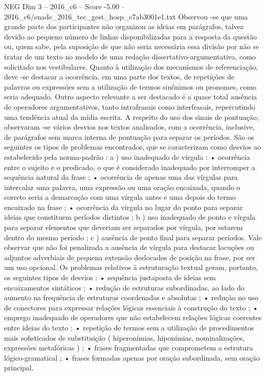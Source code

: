 \begin{textsample}{NEG Dim 3 – 2016\_c6 – Score -5.00 – 2016\_c6/enade\_2016\_tec\_gest\_hosp\_c7ab3001e1.txt}
Observou -se que uma grande parte dos participantes não organizou as ideias em parágrafos, talvez devido ao pequeno número de linhas disponibilizadas para a resposta da questão ou, quem sabe, pela suposição de que não seria necessária essa divisão por não se tratar de um texto no modelo de uma redação dissertativo-argumentativa, como solicitado nos vestibulares.
Quanto à utilização dos mecanismos de referenciação, deve -se destacar a ocorrência, em uma parte dos textos, de repetições de palavras ou expressões sem a utilização de termos sinônimos ou pronomes, como seria adequado.
Outro aspecto relevante a ser destacado é a quase total ausência de operadores argumentativos, tanto intrafrasais como interfrasais, repercutindo uma tendência atual da mídia escrita.
A respeito do uso dos sinais de pontuação, observaram -se vários desvios nos textos analisados, com a ocorrência, inclusive, de parágrafos sem marca interna de pontuação para separar os períodos.
São os seguintes os tipos de problemas encontrados, que se caracterizam como desvios ao estabelecido pela norma-padrão : a ) uso inadequado de vírgula : • ocorrência entre o sujeito e o predicado, o que é considerado inadequado por interromper a sequência natural da frase ; • ocorrência de apenas uma das vírgulas para intercalar uma palavra, uma expressão ou uma oração encaixada, quando o correto seria a demarcação com uma vírgula antes e uma depois do termo encaixado na frase ; • ocorrência da vírgula no lugar do ponto para separar ideias que constituem períodos distintos ; b ) uso inadequado de ponto e vírgula para separar elementos que deveriam ser separados por vírgula, por estarem dentro do mesmo período ; c ) ausência de ponto final para separar períodos.
Vale observar que não foi penalizada a ausência de vírgula para destacar locuções ou adjuntos adverbiais de pequena extensão deslocados de posição na frase, por ser um uso opcional.
Os problemas relativos à estruturação textual geram, portanto, os seguintes tipos de desvios : • sequência justaposta de ideias sem encaixamentos sintáticos ; • redução de estruturas subordinadas, ao lado do aumento na frequência de estruturas coordenadas e absolutas ; • redução no uso de conectores para expressar relações lógicas essenciais à construção do texto ; • emprego inadequado de operadores que não estabelecem relações lógicas coerentes entre ideias do texto ; • repetição de termos sem a utilização de procedimentos mais sofisticados de substituição ( hiperonímias, hiponímias, nominalizações, expressões metafóricas ) ; • frases fragmentadas que comprometem a estrutura lógico-gramatical ; • frases formadas apenas por oração subordinada, sem oração principal.

\end{textsample}
